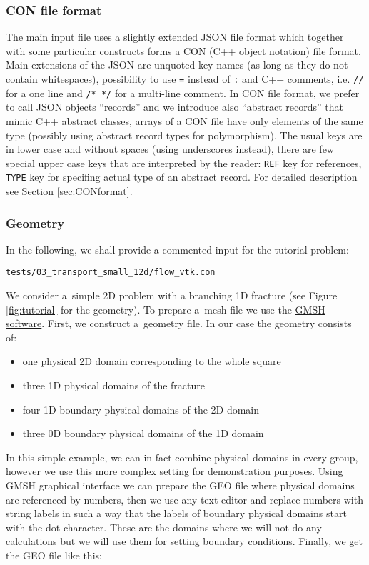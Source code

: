 \documentclass[12pt,a4paper]{report}
\begin{document}
\subsubsection{CON file format}
The main input file uses a slightly extended JSON file format which together with some particular constructs forms a CON (C++ object notation) file format. 
Main extensions of the JSON are unquoted key names (as long as they do not contain whitespaces), possibility to use \verb'=' instead of \verb':' 
and C++ comments, i.e. \verb'//' for a one line and \verb'/* */' for a multi-line comment. In CON file format, we prefer to call JSON objects ``records'' and we introduce also ``abstract records''
that mimic C++ abstract classes, arrays of a CON file have only elements of the same type (possibly using abstract record types for polymorphism). 
The usual keys are in lower case and without spaces (using underscores instead),
there are few special upper case keys that are interpreted by the reader: \verb'REF' key for references, \verb'TYPE' key for specifing actual type of an abstract record.
For detailed description see Section \ref{sec:CONformat}.

\subsubsection{Geometry}
In the following, we shall provide a commented input for the tutorial problem:
\begin{verbatim}
tests/03_transport_small_12d/flow_vtk.con
\end{verbatim}

We consider a~simple 2D problem with a branching 1D fracture (see Figure \ref{fig:tutorial} for the geometry). To prepare a~mesh file we use the \href{http://geuz.org/gmsh/}{GMSH software}.
First, we construct a~geometry file. In our case the geometry consists of: 
\begin{itemize}
 \item one physical 2D domain corresponding to the whole square
 \item three 1D physical domains of the fracture
 \item four 1D boundary physical domains of the 2D domain
 \item three 0D boundary physical domains of the 1D domain
\end{itemize}
In this simple example, we can in fact combine physical domains in every group, however we use this more complex setting for
demonstration purposes. Using GMSH graphical interface we can prepare the GEO file where physical domains are referenced by numbers, then we use 
any text editor and replace numbers with string labels in such a way that the labels of boundary physical domains start with the dot character. 
These are the domains where we will not do any calculations but we will use them for setting boundary conditions.
Finally, we get the GEO file like this:
\end{document}
